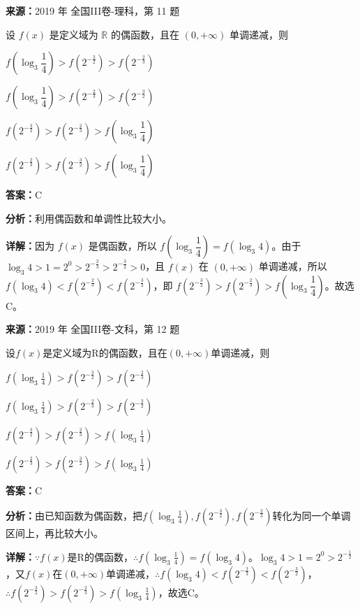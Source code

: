 \begin{question}[points=5]
\textbf{来源：}2019 年 全国III卷-理科，第 11 题\par
设 $f(x)$ 是定义域为 $\mathbb{R}$ 的偶函数，且在 $(0,+\infty)$ 单调递减，则
\begin{choices}
  \item $f\left(\log_3\dfrac{1}{4}\right) > f\left(2^{-\frac{3}{2}}\right) > f\left(2^{-\frac{2}{3}}\right)$
  \item $f\left(\log_3\dfrac{1}{4}\right) > f\left(2^{-\frac{2}{3}}\right) > f\left(2^{-\frac{3}{2}}\right)$
  \item $f\left(2^{-\frac{3}{2}}\right) > f\left(2^{-\frac{2}{3}}\right) > f\left(\log_3\dfrac{1}{4}\right)$
  \item $f\left(2^{-\frac{2}{3}}\right) > f\left(2^{-\frac{3}{2}}\right) > f\left(\log_3\dfrac{1}{4}\right)$
\end{choices}
\begin{solution}
\textbf{答案：}C

\textbf{分析：}利用偶函数和单调性比较大小。

\textbf{详解：}因为 $f(x)$ 是偶函数，所以 $f\left(\log_3\dfrac{1}{4}\right) = f(\log_3 4)$。由于 $\log_3 4 > 1 = 2^0 > 2^{-\frac{2}{3}} > 2^{-\frac{3}{2}} > 0$，且 $f(x)$ 在 $(0,+\infty)$ 单调递减，所以 $f(\log_3 4) < f\left(2^{-\frac{2}{3}}\right) < f\left(2^{-\frac{3}{2}}\right)$，即 $f\left(2^{-\frac{3}{2}}\right) > f\left(2^{-\frac{2}{3}}\right) > f\left(\log_3\dfrac{1}{4}\right)$。故选 C。
\end{solution}
\end{question}

\begin{question}[points=5]
\textbf{来源：}2019 年 全国III卷-文科，第 12 题\par
设$f(x)$是定义域为R的偶函数，且在$(0,+\infty)$单调递减，则
\begin{choices}
  \item $f(\log_3\frac{1}{4})>f(2^{-\frac{3}{2}})>f(2^{-\frac{2}{3}})$
  \item $f(\log_3\frac{1}{4})>f(2^{-\frac{2}{3}})>f(2^{-\frac{3}{2}})$
  \item $f(2^{-\frac{3}{2}})>f(2^{-\frac{2}{3}})>f(\log_3\frac{1}{4})$
  \item $f(2^{-\frac{2}{3}})>f(2^{-\frac{3}{2}})>f(\log_3\frac{1}{4})$
\end{choices}
\begin{solution}
\textbf{答案：}C

\textbf{分析：}由已知函数为偶函数，把$f(\log_3\frac{1}{4}), f(2^{-\frac{3}{2}}), f(2^{-\frac{2}{3}})$转化为同一个单调区间上，再比较大小。

\textbf{详解：}$\because f(x)$是R的偶函数，$\therefore f(\log_3\frac{1}{4})=f(\log_3 4)$。$\log_3 4>1=2^0>2^{-\frac{1}{2}}$，又$f(x)$在$(0,+\infty)$单调递减，$\therefore f(\log_3 4)<f(2^{-\frac{2}{3}})<f(2^{-\frac{3}{2}})$，$\therefore f(2^{-\frac{3}{2}})>f(2^{-\frac{2}{3}})>f(\log_3\frac{1}{4})$，故选C。
\end{solution}
\end{question}

